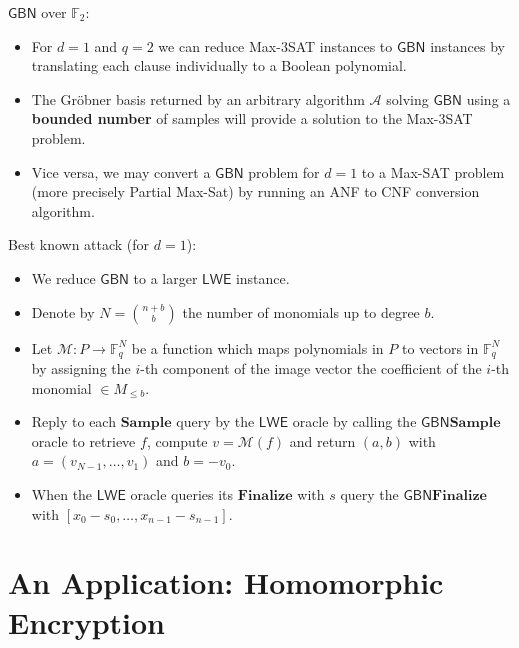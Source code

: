 \documentclass[10pt]{beamer}
\renewcommand{\emph}[1]{{\bf #1}}
\newcommand{\field}[1]{\mathbb{#1}}
\newcommand{\F}{\field{F}}
\newcommand{\A}{\ensuremath{\mathcal{A}}\xspace}
\newcommand{\Finalize}{\mathbf{Finalize}}
\newcommand{\Sample}{\mathbf{Sample}}
\newcommand{\GBN}{\ensuremath{\mathsf{GBN}}\xspace}
\newcommand{\LWE}{\ensuremath{\mathsf{LWE}}\xspace}
\renewcommand{\emph}[1]{\textbf{#1}}
\begin{document}
\begin{frame}[allowframebreaks]
\framebreak

\GBN over $\F_2$:

\begin{itemize}
 \item For $d=1$ and $q=2$ we can reduce \textsf{Max-3SAT} instances to \GBN instances by translating each clause individually to a Boolean polynomial. 
 \item The Gröbner basis returned by an arbitrary algorithm $\A$ solving \GBN using a \emph{bounded number} of samples will provide a solution to the \textsf{Max-3SAT} problem.
 \item Vice versa, we may convert a \GBN problem for $d=1$ to a \textsf{Max-SAT} problem (more precisely \textsf{Partial Max-Sat}) by running an ANF to CNF conversion algorithm.
\end{itemize}
 
\framebreak

Best known attack (for $d=1$):

\begin{itemize}
 \item We reduce \GBN to a larger \LWE instance.
 \item Denote by $N = {n + b \choose b}$ the number of monomials up to degree $b$. 
 \item Let $\mathcal{M}: P \rightarrow \F_q^N$ be a function which maps polynomials in $P$ to vectors in $\F_q^N$ by assigning the $i$-th component of the image vector the coefficient of the $i$-th monomial $\in M_{\leq b}$. 
 \item Reply to each $\Sample$ query by the \LWE oracle by calling the \GBN $\Sample$ oracle to retrieve $f$, compute $v = \mathcal{M}(f)$ and return $(a,b)$ with $a=(v_{N-1},\dots,v_{1})$ and $b=-v_0$. 
 \item When the \LWE oracle queries its $\Finalize$ with $s$ query the \GBN $\Finalize$ with $[x_0 - s_0,\dots,x_{n-1} - s_{n-1}]$. 
\end{itemize}

\end{frame}

\section{An Application: Homomorphic Encryption}
\end{document}
